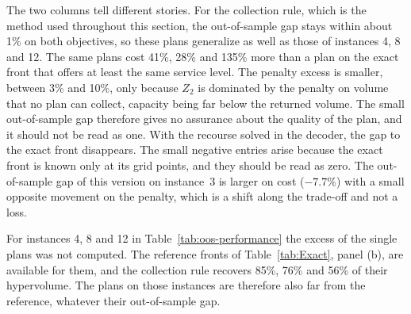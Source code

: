 \documentclass[11pt, a4paper]{article}
\begin{document}
The two columns tell different stories. For the collection rule, which is the method used throughout this section, the out-of-sample gap stays within about 1\% on both objectives, so these plans generalize as well as those of instances 4, 8 and 12. The same plans cost 41\%, 28\% and 135\% more than a plan on the exact front that offers at least the same service level. The penalty excess is smaller, between 3\% and 10\%, only because $Z_2$ is dominated by the penalty on volume that no plan can collect, capacity being far below the returned volume. The small out-of-sample gap therefore gives no assurance about the quality of the plan, and it should not be read as one. With the recourse solved in the decoder, the gap to the exact front disappears. The small negative entries arise because the exact front is known only at its grid points, and they should be read as zero. The out-of-sample gap of this version on instance~3 is larger on cost ($-7.7\%$) with a small opposite movement on the penalty, which is a shift along the trade-off and not a loss.

For instances 4, 8 and 12 in Table~\ref{tab:oos-performance} the excess of the single plans was not computed. The reference fronts of Table~\ref{tab:Exact}, panel (b), are available for them, and the collection rule recovers 85\%, 76\% and 56\% of their hypervolume. The plans on those instances are therefore also far from the reference, whatever their out-of-sample gap.
\end{document}
